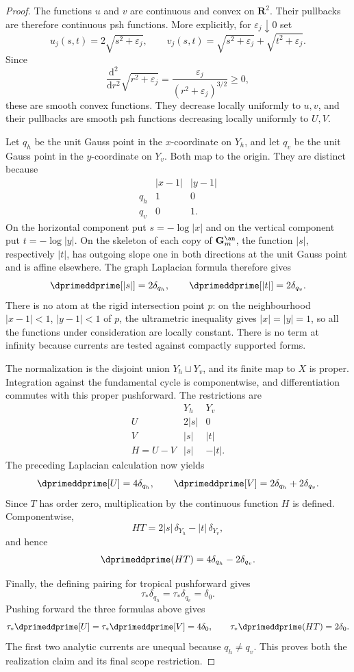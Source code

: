 \begin{proof}
The functions $u$ and $v$ are continuous and convex on $\mathbf R^2$.
Their pullbacks are therefore continuous psh functions.  More explicitly,
for $\varepsilon_j\downarrow0$ set
\[
 u_j(s,t)=2\sqrt{s^2+\varepsilon_j},\qquad
 v_j(s,t)=\sqrt{s^2+\varepsilon_j}
          +\sqrt{t^2+\varepsilon_j}.
\]
Since
\[
 \frac{\mathrm d^2}{\mathrm dr^2}\sqrt{r^2+\varepsilon_j}
 =\frac{\varepsilon_j}{(r^2+\varepsilon_j)^{3/2}}\geq0,
\]
these are smooth convex functions.  They decrease locally uniformly to
$u,v$, and their pullbacks are smooth psh functions decreasing locally
uniformly to $U,V$.

Let $q_h$ be the unit Gauss point in the $x$-coordinate on $Y_h$, and let
$q_v$ be the unit Gauss point in the $y$-coordinate on $Y_v$.  Both map to
the origin.  They are distinct because
\[
 \begin{array}{c|cc}
       &|x-1|&|y-1|\\ \hline
  q_h  &1&0\\
  q_v  &0&1.
 \end{array}
\]
On the horizontal component put $s=-\log|x|$ and on the vertical component
put $t=-\log|y|$.  On the skeleton of each copy of $\mathbf G_m^{\an}$,
the function $|s|$, respectively $|t|$, has outgoing slope one in both
directions at the unit Gauss point and is affine elsewhere.  The graph
Laplacian formula therefore gives
\[
 \dprimeddprime[|s|]=2\delta_{q_h},\qquad
 \dprimeddprime[|t|]=2\delta_{q_v}.
\]
There is no atom at the rigid intersection point $p$: on the neighbourhood
$|x-1|<1$, $|y-1|<1$ of $p$, the ultrametric inequality gives
$|x|=|y|=1$, so all the functions under consideration are locally
constant.  There is no term at infinity because currents are tested against
compactly supported forms.

The normalization is the disjoint union $Y_h\sqcup Y_v$, and its finite
map to $X$ is proper.  Integration against the fundamental cycle is
componentwise, and differentiation commutes with this proper pushforward.
The restrictions are
\[
 \begin{array}{c|cc}
       &Y_h&Y_v\\ \hline
 U     &2|s|&0\\
 V     &|s|&|t|\\
 H=U-V &|s|&-|t|.
 \end{array}
\]
The preceding Laplacian calculation now yields
\[
 \dprimeddprime[U]=4\delta_{q_h},\qquad
 \dprimeddprime[V]=2\delta_{q_h}+2\delta_{q_v}.
\]
Since $T$ has order zero, multiplication by the continuous function $H$ is
defined.  Componentwise,
\[
 HT=2|s|\,\delta_{Y_h}-|t|\,\delta_{Y_v},
\]
and hence
\[
 \dprimeddprime(HT)=4\delta_{q_h}-2\delta_{q_v}.
\]

Finally, the defining pairing for tropical pushforward gives
\[
 \tau_*\delta_{q_h}=\tau_*\delta_{q_v}=\delta_0.
\]
Pushing forward the three formulas above gives
\[
 \tau_*\dprimeddprime[U]=\tau_*\dprimeddprime[V]=4\delta_0,
 \qquad
 \tau_*\dprimeddprime(HT)=2\delta_0.
\]
The first two analytic currents are unequal because $q_h\ne q_v$.  This
proves both the realization claim and its final scope restriction.
\end{proof}

